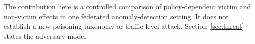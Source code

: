 \begin{sloppypar}
The contribution here is a controlled comparison of policy-dependent victim and non-victim effects in one federated anomaly-detection setting. It does not establish a new poisoning taxonomy or traffic-level attack.
Section~\ref{sec:threat} states the adversary model.
\end{sloppypar}
